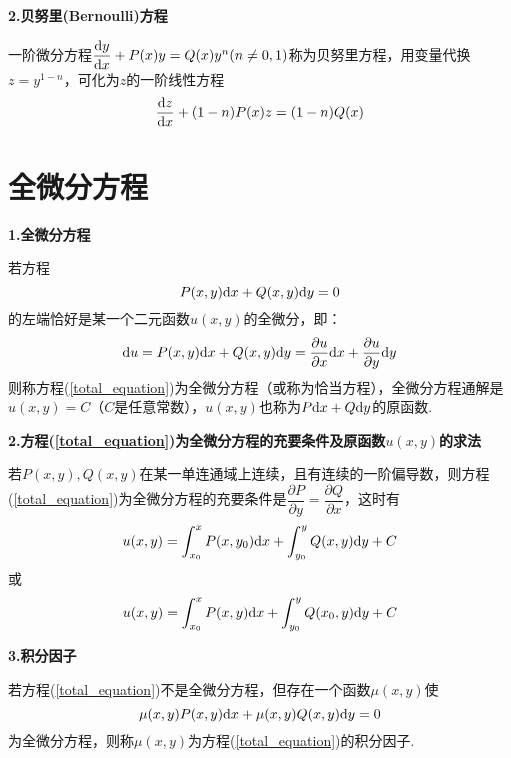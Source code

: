 \textbf{2.贝努里(Bernoulli)方程}

一阶微分方程$\dfrac{\mathrm{d} y}{\mathrm{d} x}+P(x)y=Q(x)y^n(n\neq0,1)$称为贝努里方程，用变量代换$z=y^{1-n}$，可化为$z$的一阶线性方程
\begin{equation*}
    \dfrac{\mathrm{d} z}{\mathrm{d} x}+(1-n)P(x)z=(1-n)Q(x)
\end{equation*}

\section{全微分方程}
\textbf{1.全微分方程}

若方程
\begin{equation}
    P(x,y)\mathrm{d} x+Q(x,y)\mathrm{d} y=0 \label{total_equation}
\end{equation}
的左端恰好是某一个二元函数$u(x,y)$的全微分，即：
\begin{equation*}
    \mathrm{d} u=P(x,y)\mathrm{d} x+Q(x,y)\mathrm{d} y=\dfrac{\partial u}{\partial x}\mathrm{d} x+\dfrac{\partial u}{\partial y}\mathrm{d} y
\end{equation*}
则称方程(\ref{total_equation})为全微分方程（或称为恰当方程），全微分方程通解是$u(x,y)=C$（$C$是任意常数），$u(x,y)$也称为$P\mathrm{d} x+Q\mathrm{d} y$的原函数.

\textbf{2.方程(\ref{total_equation})为全微分方程的充要条件及原函数$u(x,y)$的求法}

若$P(x,y),Q(x,y)$在某一单连通域上连续，且有连续的一阶偏导数，则方程(\ref{total_equation})为全微分方程的充要条件是$\dfrac{\partial P}{\partial y}=\dfrac{\partial Q}{\partial x}$，这时有
\begin{equation*}
    u(x,y)=\int_{x_0}^x P(x,y_0)\mathrm{d} x+\int_{y_0}^y Q(x,y)\mathrm{d} y+C
\end{equation*}
或
\begin{equation*}
    u(x,y)=\int_{x_0}^x P(x,y)\mathrm{d} x+\int_{y_0}^y Q(x_0,y)\mathrm{d} y+C
\end{equation*}

\textbf{3.积分因子}

若方程(\ref{total_equation})不是全微分方程，但存在一个函数$\mu(x,y)$使
\begin{equation*}
    \mu(x,y)P(x,y)\mathrm{d} x+\mu(x,y)Q(x,y)\mathrm{d} y=0
\end{equation*}
为全微分方程，则称$\mu(x,y)$为方程(\ref{total_equation})的积分因子.


